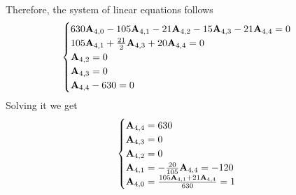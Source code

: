 \begin{examp}
\begin{equation*}
\begin{split}
        \end{split}
    \end{equation*}
    Therefore, the system of linear equations follows
    \begin{equation*}
        \begin{cases}
            630 {\mathbf{A}} \sb{4,0} - 105 {\mathbf{A}} \sb{4,1} - 21 {\mathbf{A}} \sb{4,2} - 15 {\mathbf{A}} \sb{4,3} - 21 {\mathbf{A}} \sb{4,4} = 0 \\
            105 {\mathbf{A}} \sb{4,1} + \frac{21}{2} {\mathbf{A}} \sb{4,3} + 20 {\mathbf{A}} \sb{4,4} = 0 \\
            {\mathbf{A}} \sb{4,2} = 0 \\
            {\mathbf{A}} \sb{4,3} = 0 \\
            {\mathbf{A}} \sb{4,4} - 630 = 0
        \end{cases}
    \end{equation*}
    Solving it we get
    \begin{equation*}
        \begin{cases}
            {\mathbf{A}} \sb{4,4} = 630 \\
            {\mathbf{A}} \sb{4,3} = 0 \\
            {\mathbf{A}} \sb{4,2} = 0 \\
            {\mathbf{A}} \sb{4,1} = - \frac{20}{105} {\mathbf{A}} \sb{4,4} = -120 \\
            {\mathbf{A}} \sb{4,0} = \frac{105 {\mathbf{A}} \sb{4,1} + 21 {\mathbf{A}} \sb{4,4}}{630} = 1
        \end{cases}
    \end{equation*}
\end{examp}
